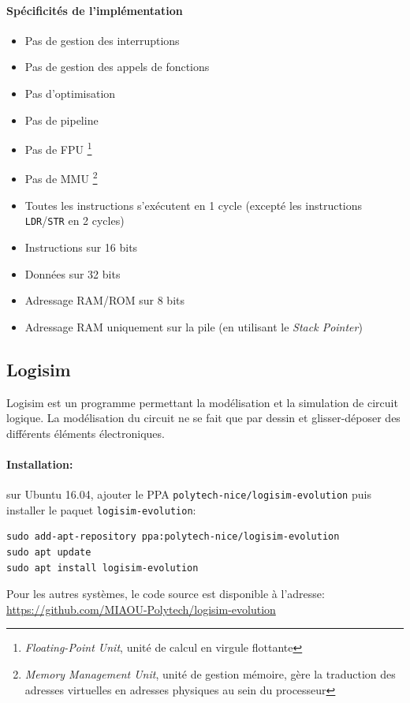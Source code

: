 \paragraph{Spécificités de l'implémentation}
\begin{itemize}
	\item Pas de gestion des interruptions
	\item Pas de gestion des appels de fonctions
	\item Pas d'optimisation
	\item Pas de pipeline
	\item Pas de FPU \footnote{\textit{Floating-Point Unit}, unité de calcul en virgule flottante}
	\item Pas de MMU \footnote{\textit{Memory Management Unit}, unité de gestion mémoire, gère la traduction des adresses virtuelles en adresses physiques au sein du processeur}
	\item Toutes les instructions s'exécutent en 1 cycle (excepté les instructions \texttt{LDR}/\texttt{STR} en 2 cycles)
	\item Instructions sur 16 bits
	\item Données sur 32 bits
	\item Adressage RAM/ROM sur 8 bits
	\item Adressage RAM uniquement sur la pile (en utilisant le \textit{Stack Pointer})
\end{itemize}

\subsection{Logisim}

Logisim est un programme permettant la modélisation et la simulation de circuit logique. La modélisation du circuit ne se fait que par dessin et glisser-déposer des différents éléments électroniques.

\paragraph{Installation:} sur Ubuntu 16.04, ajouter le PPA \texttt{polytech-nice/logisim-evolution} puis installer le paquet \texttt{logisim-evolution}:
\begin{lstlisting}
sudo add-apt-repository ppa:polytech-nice/logisim-evolution
sudo apt update
sudo apt install logisim-evolution
\end{lstlisting}
Pour les autres systèmes, le code source est disponible à l'adresse: \url{https://github.com/MIAOU-Polytech/logisim-evolution}


